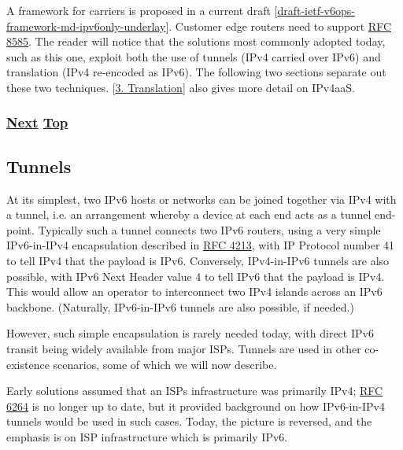 \documentclass[
]{article}
\begin{document}
A framework for carriers is proposed in a current draft
{[}\href{https://datatracker.ietf.org/doc/draft-ietf-v6ops-framework-md-ipv6only-underlay/}{draft-ietf-v6ops-framework-md-ipv6only-underlay}{]}.
Customer edge routers need to support
\href{https://www.rfc-editor.org/info/rfc8585}{RFC 8585}. The reader
will notice that the solutions most commonly adopted today, such as this
one, exploit both the use of tunnels (IPv4 carried over IPv6) and
translation (IPv4 re-encoded as IPv6). The following two sections
separate out these two techniques.
{[}\hyperref[translation-and-ipv4-as-a-service]{3. Translation}{]} also
gives more detail on IPv4aaS.

\subsubsection{\texorpdfstring{\hyperref[tunnels]{Next}
\hyperref[coexistence-with-legacy-ipv4]{Top}}{Next Top}}\label{next-top-2}

\pagebreak

\subsection{Tunnels}\label{tunnels}

At its simplest, two IPv6 hosts or networks can be joined together via
IPv4 with a tunnel, i.e. an arrangement whereby a device at each end
acts as a tunnel end-point. Typically such a tunnel connects two IPv6
routers, using a very simple IPv6-in-IPv4 encapsulation described in
\href{https://www.rfc-editor.org/info/rfc4213}{RFC 4213}, with IP
Protocol number 41 to tell IPv4 that the payload is IPv6. Conversely,
IPv4-in-IPv6 tunnels are also possible, with IPv6 Next Header value 4 to
tell IPv6 that the payload is IPv4. This would allow an operator to
interconnect two IPv4 islands across an IPv6 backbone. (Naturally,
IPv6-in-IPv6 tunnels are also possible, if needed.)

However, such simple encapsulation is rarely needed today, with direct
IPv6 transit being widely available from major ISPs. Tunnels are used in
other co-existence scenarios, some of which we will now describe.

Early solutions assumed that an ISP\textquotesingle s infrastructure was
primarily IPv4; \href{https://www.rfc-editor.org/info/rfc6264}{RFC 6264}
is no longer up to date, but it provided background on how IPv6-in-IPv4
tunnels would be used in such cases. Today, the picture is reversed, and
the emphasis is on ISP infrastructure which is primarily IPv6.
\end{document}
